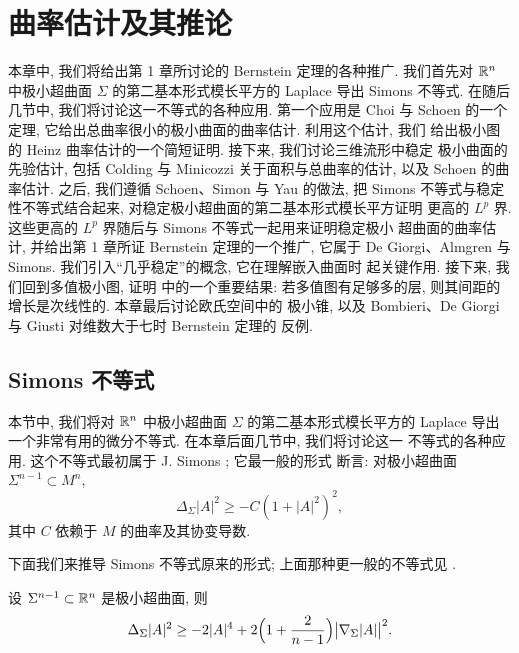 \chapter{曲率估计及其推论}
\label{chap:2}

本章中, 我们将给出第 1 章所讨论的 Bernstein 定理的各种推广. 我们首先对
$\mathbb{R}^n$ 中极小超曲面 $\Sigma$ 的第二基本形式模长平方的 Laplace 导出 Simons
不等式. 在随后几节中, 我们将讨论这一不等式的各种应用. 第一个应用是 Choi 与
Schoen 的一个定理, 它给出总曲率很小的极小曲面的曲率估计. 利用这个估计, 我们
给出极小图的 Heinz 曲率估计的一个简短证明. 接下来, 我们讨论三维流形中稳定
极小曲面的先验估计, 包括 Colding 与 Minicozzi 关于面积与总曲率的估计, 以及
Schoen 的曲率估计. 之后, 我们遵循 Schoen、Simon 与 Yau 的做法, 把 Simons
不等式与稳定性不等式结合起来, 对稳定极小超曲面的第二基本形式模长平方证明
更高的 $L^p$ 界. 这些更高的 $L^p$ 界随后与 Simons 不等式一起用来证明稳定极小
超曲面的曲率估计, 并给出第 1 章所证 Bernstein 定理的一个推广, 它属于
De Giorgi、Almgren 与 Simons. 我们引入``几乎稳定''的概念, 它在理解嵌入曲面时
起关键作用. 接下来, 我们回到多值极小图, 证明 \cite{CM3} 中的一个重要结果:
若多值图有足够多的层, 则其间距的增长是次线性的. 本章最后讨论欧氏空间中的
极小锥, 以及 Bombieri、De Giorgi 与 Giusti 对维数大于七时 Bernstein 定理的
反例.

\section{Simons 不等式}
\label{sec:2.1}

本节中, 我们将对 $\mathbb{R}^n$ 中极小超曲面 $\Sigma$ 的第二基本形式模长平方的
Laplace 导出一个非常有用的微分不等式. 在本章后面几节中, 我们将讨论这一
不等式的各种应用. 这个不等式最初属于 J. Simons \cite{Sim}; 它最一般的形式
断言: 对极小超曲面 $\Sigma^{n-1}\subset M^n$,
\begin{equation}
\Delta_{\Sigma}|A|^{2}\geq -C(1+|A|^{2})^{2},
\label{eq:2.1}
\end{equation}
其中 $C$ 依赖于 $M$ 的曲率及其协变导数.

下面我们来推导 Simons 不等式原来的形式; 上面那种更一般的不等式见
\cite{ScSiYa}.

\begin{lemma}
\label{lem:2.1}
设 $\Sigma^{n-1}\subset\mathbb{R}^n$ 是极小超曲面, 则
\begin{equation}
\Delta_{\Sigma}|A|^{2}\geq -2|A|^{4}
 +2\Bigl(1+\frac{2}{n-1}\Bigr)\bigl|\nabla_{\Sigma}|A|\bigr|^{2}.
\label{eq:2.2}
\end{equation}
\end{lemma}

